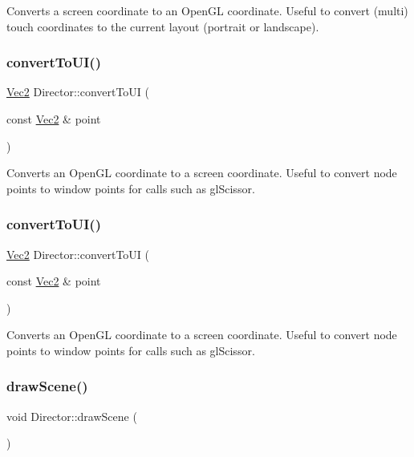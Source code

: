 Converts a screen coordinate to an Open\+GL coordinate. Useful to convert (multi) touch coordinates to the current layout (portrait or landscape). \mbox{\label{classDirector_a932324432ae4ccc8819db508951644e4}} 
\subsubsection{\texorpdfstring{convert\+To\+U\+I()}{convertToUI()}\hspace{0.1cm}{\footnotesize\ttfamily [1/2]}}
{\footnotesize\ttfamily \hyperlink{classVec2}{Vec2} Director\+::convert\+To\+UI (\begin{DoxyParamCaption}\item[{const \hyperlink{classVec2}{Vec2} \&}]{point }\end{DoxyParamCaption})}

Converts an Open\+GL coordinate to a screen coordinate. Useful to convert node points to window points for calls such as gl\+Scissor. \mbox{\label{classDirector_a932324432ae4ccc8819db508951644e4}} 
\subsubsection{\texorpdfstring{convert\+To\+U\+I()}{convertToUI()}\hspace{0.1cm}{\footnotesize\ttfamily [2/2]}}
{\footnotesize\ttfamily \hyperlink{classVec2}{Vec2} Director\+::convert\+To\+UI (\begin{DoxyParamCaption}\item[{const \hyperlink{classVec2}{Vec2} \&}]{point }\end{DoxyParamCaption})}

Converts an Open\+GL coordinate to a screen coordinate. Useful to convert node points to window points for calls such as gl\+Scissor. \mbox{\label{classDirector_a9ab4f229ddfcf735ded9b8f25e091481}} 
\subsubsection{\texorpdfstring{draw\+Scene()}{drawScene()}\hspace{0.1cm}{\footnotesize\ttfamily [1/2]}}
{\footnotesize\ttfamily void Director\+::draw\+Scene (\begin{DoxyParamCaption}{ }\end{DoxyParamCaption})}

